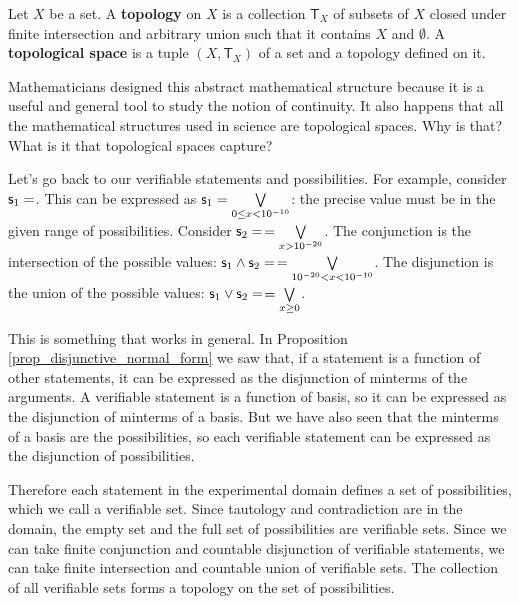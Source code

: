\documentclass[11pt,letterpaper,fleqn]{memoir} %
\begin{document}
\begin{mathSection}
	\begin{defn}
		Let $X$ be a set. A \textbf{topology} on $X$ is a collection $\mathsf{T}_X$ of subsets of $X$ closed under finite intersection and arbitrary union such that it contains $X$ and $\emptyset$. A \textbf{topological space} is a tuple $(X, \mathsf{T}_X)$ of a set and a topology defined on it.
	\end{defn}
\end{mathSection}

Mathematicians designed this abstract mathematical structure because it is a useful and general tool to study the notion of continuity. It also happens that all the mathematical structures used in science are topological spaces. Why is that? What is it that topological spaces capture?

Let's go back to our verifiable statements and possibilities. For example, consider $\mathsf{s}_1=$. This can be expressed as $\mathsf{s}_1=\bigvee\limits_{0\leq x<10^{-10}}$: the precise value must be in the given range of possibilities. Consider $\mathsf{s}_2=$$=\bigvee\limits_{x>10^{-20}}$. The conjunction is the intersection of the possible values: $\mathsf{s}_1\wedge\mathsf{s}_2=$$=\bigvee\limits_{10^{-20}< x<10^{-10}}$. The disjunction is the union of the possible values: $\mathsf{s}_1\vee\mathsf{s}_2=$$=\bigvee\limits_{x\geq0}$.

This is something that works in general. In Proposition \ref{prop_disjunctive_normal_form} we saw that, if a statement is a function of other statements, it can be expressed as the disjunction of minterms of the arguments. A verifiable statement is a function of basis, so it can be expressed as the disjunction of minterms of a basis. But we have also seen that the minterms of a basis are the possibilities, so each verifiable statement can be expressed as the disjunction of possibilities.


Therefore each statement in the experimental domain defines a set of possibilities, which we call a verifiable set. Since tautology and contradiction are in the domain, the empty set and the full set of possibilities are verifiable sets. Since we can take finite conjunction and countable disjunction of verifiable statements, we can take finite intersection and countable union of verifiable sets. The collection of all verifiable sets forms a topology on the set of possibilities.
\end{document}
